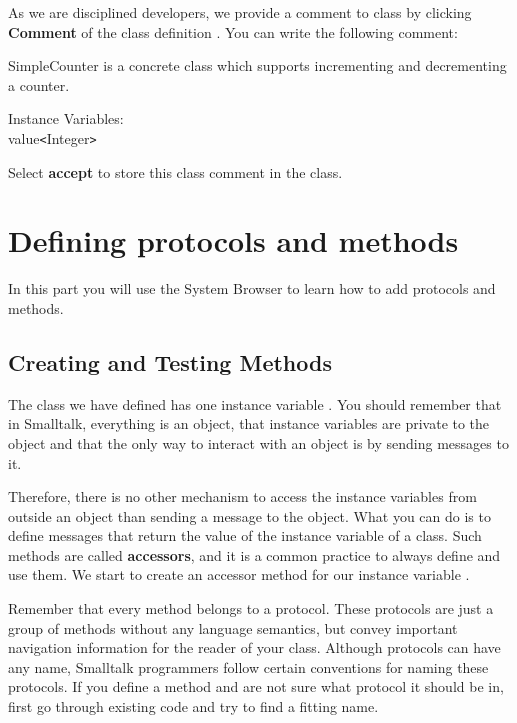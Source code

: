 As we are disciplined developers, we provide a comment to
 class by clicking \textbf{Comment}  of
the class definition . You can write the following
comment:

\begin{scode}
SimpleCounter is a concrete class which supports incrementing
and decrementing a counter.

Instance Variables:\\
value\tab \texttt{<}Integer\texttt{>}
\end{scode}

Select \textbf{accept} to store this class comment in the class.


\section{Defining protocols and methods}
In this part you will use the System Browser to learn how to add
protocols and methods.


\subsection{Creating and Testing Methods}
The class we have defined has one instance variable . You should
remember that in Smalltalk, everything is an object, that instance variables are private to the object and  that the only way to interact with an object is by sending messages to it.

Therefore, there is no other mechanism to access the instance variables from outside an object than sending a message to the object. What you can do is to define messages that return the value of the instance variable of a class. Such methods are called \textbf{accessors}, and it is a common practice to always define and use them. We start to create an accessor method for our instance variable .

Remember that every method belongs to a protocol. These protocols are just
a group of methods without any language semantics, but convey important
navigation information for the reader of your class. Although protocols
can have any name, Smalltalk programmers follow certain conventions for
naming these protocols. If you define a method and are not sure what
protocol it should be in, first go through existing code and try to
find a fitting name.


